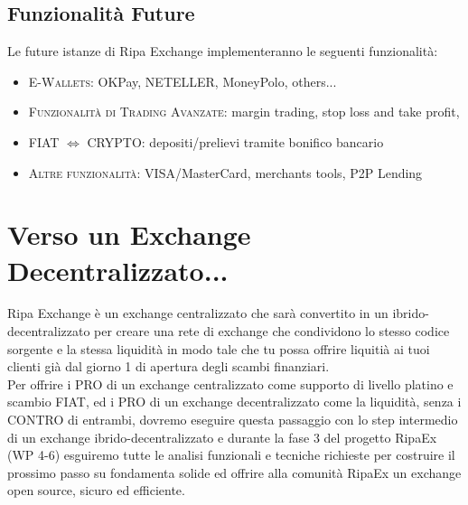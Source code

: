 \documentclass[11pt,fleqn]{book} %
\begin{document}
\subsection{Funzionalità Future}
Le future istanze di Ripa Exchange implementeranno le seguenti funzionalità:
\begin{itemize}
	\item \textsc{\textsc{E-Wallets}}: OKPay, NETELLER, MoneyPolo, others...
	\item \textsc{\textsc{Funzionalità di Trading Avanzate}}: margin trading, stop loss and take profit, 
	\item \textsc{\textsc{FIAT $\Leftrightarrow$ CRYPTO}}: depositi/prelievi tramite bonifico bancario
	\item \textsc{\textsc{Altre funzionalità}}: VISA/MasterCard, merchants tools, P2P Lending 
\end{itemize}

\section{Verso un Exchange Decentralizzato...}
Ripa Exchange è un exchange centralizzato che sarà convertito in un ibrido-decentralizzato per creare una rete di exchange
che condividono lo stesso codice sorgente e la stessa liquidità in modo tale che tu possa offrire liquitià ai tuoi clienti 
già dal giorno 1 di apertura degli scambi finanziari.\\

Per offrire i PRO di un exchange centralizzato come supporto di livello platino e scambio FIAT, ed i PRO di un exchange 
decentralizzato come la liquidità, senza i CONTRO di entrambi, dovremo eseguire questa passaggio con lo step intermedio di un exchange 
ibrido-decentralizzato e durante la fase 3 del progetto RipaEx (WP 4-6) esguiremo tutte le analisi funzionali e tecniche 
richieste per costruire il prossimo passo su fondamenta solide ed offrire alla comunità RipaEx un exchange open source, sicuro
ed efficiente.



\end{document}

